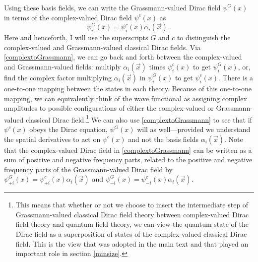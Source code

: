 \documentclass[12pt,secnumarabic,amsmath,amssymb,balancelastpage,nofootinbib]{article}
\begin{document}
Using these basis fields, we can write the Grassmann-valued Dirac field $\psi^G(x)$ in terms of the complex-valued Dirac field $\psi^c(x)$ as
\begin{equation}
\psi^G_i(x)=\psi^c_i(x) \alpha_i(\vec{x})
\ .
\label{complextoGrassmann}
\end{equation}
Here and henceforth, I will use the superscripts $G$ and $c$ to distinguish the complex-valued and Grassmann-valued classical Dirac fields.  Via \eqref{complextoGrassmann}, we can go back and forth between the complex-valued and Grassmann-valued fields: multiply $\alpha_i(\vec{x})$ times $\psi_i^c(x)$ to get $\psi^G_i(x)$, or, find the complex factor multiplying $\alpha_i(\vec{x})$ in $\psi^G_i(x)$ to get $\psi_i^c(x)$.  There is a one-to-one mapping between the states in each theory.  Because of this one-to-one mapping, we can equivalently think of the wave functional as assigning complex amplitudes to possible configurations of either the complex-valued or Grassmann-valued classical Dirac field.\footnote{This means that whether or not we choose to insert the intermediate step of Grassmann-valued classical Dirac field theory between complex-valued Dirac field theory and quantum field theory, we can view the quantum state of the Dirac field as a superposition of states of the complex-valued classical Dirac field.  This is the view that was adopted in the main text and that played an important role in section \ref{minsize}.}  We can also use \eqref{complextoGrassmann} to see that if $\psi^c(x)$ obeys the Dirac equation, $\psi^G(x)$ will as well---provided we understand the spatial derivatives to act on $\psi^c(x)$ and not the basis fields $\alpha_i(\vec{x})$.  Note that the complex-valued Dirac field in \eqref{complextoGrassmann} can be written as a sum of positive and negative frequency parts, related to the positive and negative frequency parts of the Grassmann-valued Dirac field by $\psi^G_{+i}(x)=\psi_{+i}^c(x) \alpha_i(\vec{x})$ and $\psi^G_{-i}(x)=\psi_{-i}^c(x) \alpha_i(\vec{x})$.
\end{document}
